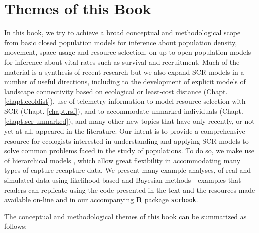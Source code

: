 


\section*{Themes of this Book}

In this book, we try to achieve a broad conceptual and methodological
scope from basic closed population models for inference about
population density, movement, space usage and resource selection, on
up to open population models for inference about vital rates such as
survival and recruitment.  Much of the material is a synthesis of
recent research but we also expand SCR models in a number of useful
directions, including to the development of explicit models of
landscape connectivity based on ecological or least-cost distance
(Chapt. \ref{chapt.ecoldist}), use of telemetry information to model
resource selection with SCR (Chapt. \ref{chapt.rsf}), and to
accommodate unmarked individuals (Chapt. \ref{chapt.scr-unmarked}),
and many other new topics that have only recently, or not yet at all,
appeared in the literature.  Our intent is to provide a comprehensive
resource for ecologists interested in understanding and applying SCR
models to solve common problems faced in the study of populations.  To
do so, we make use of hierarchical models \citep{royle_dorazio:2008},
which allow great flexibility in accommodating many types of
capture-recapture data. We present many example analyses, of real and
simulated data using likelihood-based and Bayesian methods---examples
that readers can replicate using the code presented in the text and
the resources made available on-line and in our accompanying {\bf R}
package {\tt scrbook}.

The conceptual and methodological themes of this book can be
summarized as follows:

